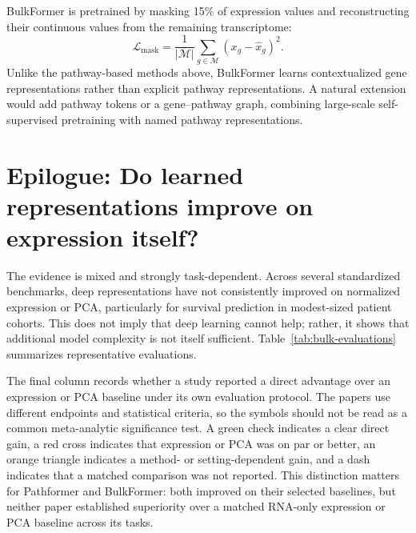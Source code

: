 \documentclass[11pt]{article}
\begin{document}
BulkFormer is pretrained by masking 15\% of expression values and reconstructing
their continuous values from the remaining transcriptome:
\begin{equation}
    \mathcal{L}_{\mathrm{mask}}
    = \frac{1}{|\mathcal{M}|}
    \sum_{g\in\mathcal{M}}(x_g-\widehat{x}_g)^2.
\end{equation}
Unlike the pathway-based methods above, BulkFormer learns contextualized gene
representations rather than explicit pathway representations. A natural
extension would add pathway tokens or a gene--pathway graph, combining
large-scale self-supervised pretraining with named pathway representations.

\section{Epilogue: Do learned representations improve on expression itself?}

The evidence is mixed and strongly task-dependent. Across several standardized
benchmarks, deep representations have not consistently improved on normalized
expression or PCA, particularly for survival prediction in modest-sized patient
cohorts. This does not imply that deep learning cannot help; rather, it shows
that additional model complexity is not itself sufficient. Table~\ref{tab:bulk-evaluations}
summarizes representative evaluations.

The final column records whether a study reported a direct advantage over an
expression or PCA baseline under its own evaluation protocol. The papers use
different endpoints and statistical criteria, so the symbols should not be
read as a common meta-analytic significance test. A green check indicates a
clear direct gain, a red cross indicates that expression or PCA was on par or
better, an orange triangle indicates a method- or setting-dependent gain, and
a dash indicates that a matched comparison was not reported. This distinction
matters for Pathformer and BulkFormer: both improved on their selected
baselines, but neither paper established superiority over a matched RNA-only
expression or PCA baseline across its tasks.
\end{document}
